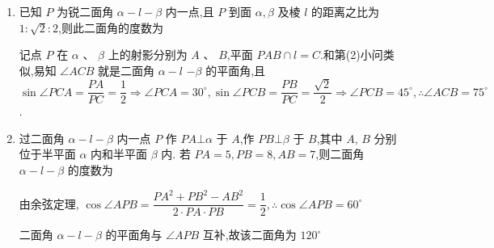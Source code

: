 \begin{enumerate}
\begin{enumerate}
\begin{jieda}
            $\therefore \angle {PCA} = {30}^{ \circ  }$,同理 $\angle {PCB} = {30}^{ \circ  },\therefore \angle {ACB} = {60}^{ \circ  }$.
        \end{jieda}
        \item 已知 $P$ 为锐二面角 $\alpha  - l - \beta$ 内一点,且 $P$ 到面 $\alpha,\beta$ 及棱 $l$ 的距离之比为 $1 : \sqrt{2} : 2$,则此二面角的度数为
        \begin{jieda}
            记点 $P$ 在 $\alpha$ 、 $\beta$ 上的射影分别为 $A$ 、 $B$,平面 ${PAB} \cap  l = C$.和第(2)小问类似,易知 $\angle {ACB}$ 就是二面角 $\alpha  - l$  $- \beta$ 的平面角,且 $\sin \angle {PCA} = \dfrac{PA}{PC} = \dfrac{1}{2} \Longrightarrow  \angle {PCA} = {30}^{ \circ  },\sin \angle {PCB} = \dfrac{PB}{PC} = \dfrac{\sqrt{2}}{2} \Longrightarrow  \angle {PCB} = {45}^{ \circ  },\therefore \angle {ACB} = {75}^{ \circ  }$.
        \end{jieda}
        \item 过二面角 $\alpha  - l - \beta$ 内一点 $P$ 作 ${PA}\bot \alpha$ 于 $A$,作 ${PB}\bot \beta$ 于 $B$,其中 $A$, $B$ 分别位于半平面 $\alpha$ 内和半平面 $\beta$ 内. 若 ${PA} = 5,{PB} = 8,{AB} = 7$,则二面角 $\alpha  - l - \beta$ 的度数为
        \begin{jieda}
            由余弦定理, $\cos \angle {APB} = \dfrac{P{A}^{2} + P{B}^{2} - A{B}^{2}}{2 \cdot  {PA} \cdot  {PB}} = \dfrac{1}{2},\therefore \cos \angle {APB} = {60}^{ \circ  }$ 
            
            二面角 $\alpha  - l - \beta$ 的平面角与 $\angle {APB}$ 互补,故该二面角为 ${120}^{ \circ  }$
        \end{jieda}
    \end{enumerate}


\end{enumerate}
